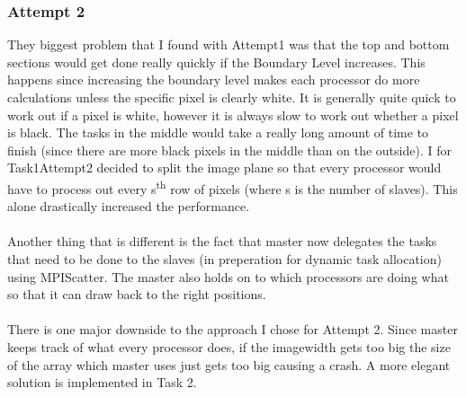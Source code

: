 \documentclass{article}
\begin{document}
        \subsubsection{Attempt 2}
            They biggest problem that I found with Attempt1 was that the top and bottom sections would get done really quickly if the Boundary Level increases.
            This happens since increasing the boundary level makes each processor do more calculations unless the specific pixel is clearly white. It is
            generally quite quick to work out if a pixel is white, however it is always slow to work out whether a pixel is black. The tasks in the middle  would take a really
            long amount of time to finish (since there are more black pixels in the middle than on the outside). I for Task1Attempt2 decided to split the image plane so that
            every processor would have to process out every s\textsuperscript{th} row of pixels (where s is the number of slaves). This alone drastically increased the performance.
            \\
            \\
            Another thing that is different is the fact that master now delegates the tasks that need to be done to the slaves (in preperation for dynamic task allocation)
            using MPI\textunderscore Scatter. The master also holds on to which processors are doing what so that it can draw back to the right positions.
            \\
            \\
            There is one major downside to the approach I chose for Attempt 2. Since master keeps track of what every processor does, if the imagewidth gets too big
            the size of the array which master uses just gets too big causing a crash. A more elegant solution is implemented in Task 2.
    
\end{document}
